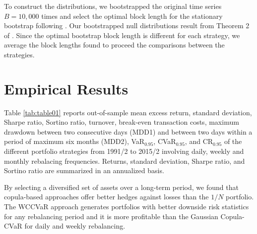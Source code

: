 \documentclass[a4paper,10pt]{article}
\begin{document}
To construct the distributions, we bootstrapped the original time series $B=10,000$ times and select the optimal block length for the stationary bootstrap following \citet*{pw04}. Our bootstrapped null distributions result from Theorem 2 of \citet*{pr94}. Since the optimal bootstrap block length is different for each strategy, we average the block lengths found to proceed the comparisons between the strategies.




\section{Empirical Results}

 Table \ref{tab:table01} reports out-of-sample mean excess return, standard deviation, Sharpe ratio, Sortino ratio, turnover, break-even transaction costs, maximum drawdown between two consecutive days (MDD1) and between two days within a period of maximum six months (MDD2), VaR$_{0.95}$, CVaR$_{0.95}$, and CR$_{0.95}$ of the different portfolio strategies from 1991/2 to 2015/2 involving daily, weekly and monthly rebalacing frequencies. Returns, standard deviation, Sharpe ratio, and Sortino ratio are summarized in an annualized basis.

By selecting a diversified set of assets over a long-term period, we found that copula-based approaches offer better hedges against losses than the $1/N$ portfolio. The WCCVaR approach generates portfolios with better downside risk statistics for any rebalancing period and it is more profitable than the Gaussian Copula-CVaR for daily and weekly rebalancing.
\end{document}
